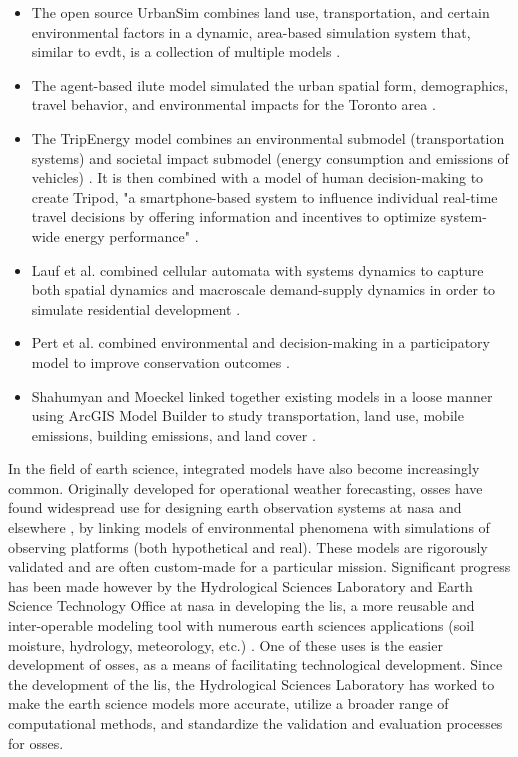 \begin{itemize} \setlength{\itemsep}{0pt} \setlength{\parskip}{0pt}
	\item{The open source UrbanSim combines land use, transportation, and certain environmental factors in a dynamic, area-based simulation system that, similar to \ac{evdt}, is a collection of multiple models \cite{waddellUrbanSimModelingUrban2002}.}
	\item{The agent-based \ac{ilute} model simulated the urban spatial form, demographics, travel behavior, and environmental impacts for the Toronto area \cite{millerHistoricalValidationIntegrated2011}.}
	\item{The TripEnergy model combines an environmental submodel (transportation systems) and societal impact submodel (energy consumption and emissions of vehicles) \cite{needellEfficientlySimulatingPersonal2018}. It is then combined with a model of human decision-making to create Tripod, "a smartphone-based system to influence individual real-time travel decisions by offering information and incentives to optimize system-wide energy performance" \cite{azevedoTripodSustainableTravel2018}.}
	\item{Lauf et al. combined cellular automata with systems dynamics to capture both spatial dynamics and macroscale demand-supply dynamics in order to simulate residential development \cite{laufUncoveringLanduseDynamics2012}.}
	\item{Pert et al. combined environmental and decision-making in a participatory model to improve conservation outcomes \cite{pertParticipatoryDevelopmentNew2013}.}
	\item{Shahumyan and Moeckel linked together existing models in a loose manner using ArcGIS Model Builder to study transportation, land use, mobile emissions, building emissions, and land cover \cite{shahumyanIntegrationLandUse2017}.}
\end{itemize} 

In the field of earth science, integrated models have also become increasingly common. Originally developed for operational weather forecasting, \acp{osse} have found widespread use for designing earth observation systems at \ac{nasa} and elsewhere \cite{masutaniObservingSystemSimulation2010}, by linking models of environmental phenomena with simulations of observing platforms (both hypothetical and real). These models are rigorously validated \cite{erricoDevelopmentValidationObservingsystem2013} and are often custom-made for a particular mission. Significant progress has been made however by the Hydrological Sciences Laboratory and Earth Science Technology Office at \ac{nasa} in developing the \ac{lis}, a more reusable and inter-operable modeling tool with numerous earth sciences applications (soil moisture, hydrology, meteorology, etc.) \cite{kumarMissionSimulationEvaluation2015}. One of these uses is the easier development of \acp{osse}, as a means of facilitating technological development. Since the development of the \ac{lis}, the Hydrological Sciences Laboratory has worked to make the earth science models more accurate, utilize  a broader range of computational methods, and standardize the validation and evaluation processes for \acp{osse}.


